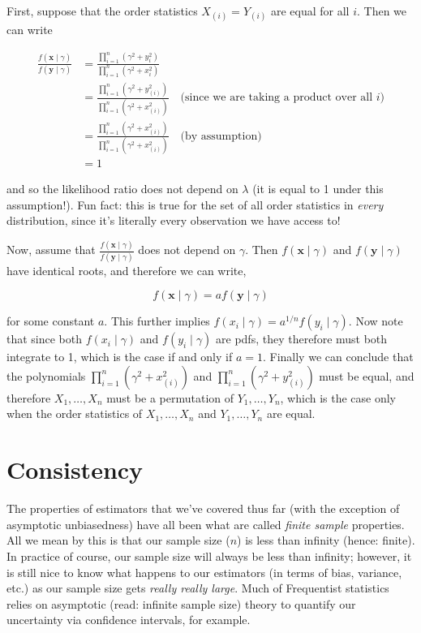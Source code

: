 \documentclass[
  letterpaper,
  DIV=11,
  numbers=noendperiod]{scrreprt}
\begin{document}
First, suppose that the order statistics \(X_{(i)} = Y_{(i)}\) are equal
for all \(i\). Then we can write

\begin{align*}
    \frac{f(\textbf{x} \mid \gamma)}{f(\textbf{y} \mid \gamma)} & = \frac{\prod_{i = 1}^n  (\gamma^2 + y_i^2)}{\prod_{i = 1}^n  (\gamma^2 + x_i^2)} \\
    & = \frac{\prod_{i = 1}^n  (\gamma^2 + y_{(i)}^2)}{\prod_{i = 1}^n  (\gamma^2 + x_{(i)}^2)} \quad \text{(since we are taking a product over all $i$)} \\
    & = \frac{\prod_{i = 1}^n  (\gamma^2 + x_{(i)}^2)}{\prod_{i = 1}^n  (\gamma^2 + x_{(i)}^2)} \quad \text{(by assumption)} \\
    & = 1
\end{align*}

and so the likelihood ratio does not depend on \(\lambda\) (it is equal
to 1 under this assumption!). Fun fact: this is true for the set of all
order statistics in \emph{every} distribution, since it's literally
every observation we have access to!

Now, assume that
\(\frac{f(\textbf{x} \mid \gamma)}{f(\textbf{y} \mid \gamma)}\) does not
depend on \(\gamma\). Then \(f(\textbf{x} \mid \gamma)\) and
\(f(\textbf{y} \mid \gamma)\) have identical roots, and therefore we can
write,

\[
f(\textbf{x} \mid \gamma)  = a f(\textbf{y} \mid \gamma)
\]

for some constant \(a\). This further implies
\(f(x_i \mid \gamma) = a^{1/n} f(y_i \mid \gamma)\). Now note that since
both \(f(x_i \mid \gamma)\) and \(f(y_i \mid \gamma)\) are pdfs, they
therefore must both integrate to 1, which is the case if and only if
\(a = 1\). Finally we can conclude that the polynomials
\(\prod_{i = 1}^n  (\gamma^2 + x_{(i)}^2)\) and
\(\prod_{i = 1}^n  (\gamma^2 + y_{(i)}^2)\) must be equal, and therefore
\(X_1, \dots, X_n\) must be a permutation of \(Y_1, \dots, Y_n\), which
is the case only when the order statistics of \(X_1, \dots, X_n\) and
\(Y_1, \dots, Y_n\) are equal.


\chapter{Consistency}\label{consistency}

The properties of estimators that we've covered thus far (with the
exception of asymptotic unbiasedness) have all been what are called
\emph{finite sample} properties. All we mean by this is that our sample
size (\(n\)) is less than infinity (hence: finite). In practice of
course, our sample size will always be less than infinity; however, it
is still nice to know what happens to our estimators (in terms of bias,
variance, etc.) as our sample size gets \emph{really really large}. Much
of Frequentist statistics relies on asymptotic (read: infinite sample
size) theory to quantify our uncertainty via confidence intervals, for
example.
\end{document}
